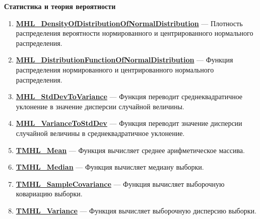 \documentclass[a4paper,12pt]{article}
\begin{document}
\textbf{Статистика и теория вероятности}
\begin{enumerate}

\item \textbf{\hyperref[MHL_DensityOfDistributionOfNormalDistribution]{MHL\_DensityOfDistributionOfNormalDistribution}} --- Плотность распределения вероятности нормированного и центрированного нормального распределения.

\item \textbf{\hyperref[MHL_DistributionFunctionOfNormalDistribution]{MHL\_DistributionFunctionOfNormalDistribution}} --- Функция распределения нормированного и центрированного нормального распределения.

\item \textbf{\hyperref[MHL_StdDevToVariance]{MHL\_StdDevToVariance}} --- Функция переводит среднеквадратичное уклонение в значение дисперсии случайной величины.

\item \textbf{\hyperref[MHL_VarianceToStdDev]{MHL\_VarianceToStdDev}} --- Функция переводит значение дисперсии случайной величины в среднеквадратичное уклонение.

\item \textbf{\hyperref[TMHL_Mean]{TMHL\_Mean}} --- Функция вычисляет среднее арифметическое массива.

\item \textbf{\hyperref[TMHL_Median]{TMHL\_Median}} --- Функция вычисляет медиану выборки.

\item \textbf{\hyperref[TMHL_SampleCovariance]{TMHL\_SampleCovariance}} --- Функция вычисляет выборочную ковариацию выборки.

\item \textbf{\hyperref[TMHL_Variance]{TMHL\_Variance}} --- Функция вычисляет выборочную дисперсию выборки.

\end{enumerate}
\end{document}
